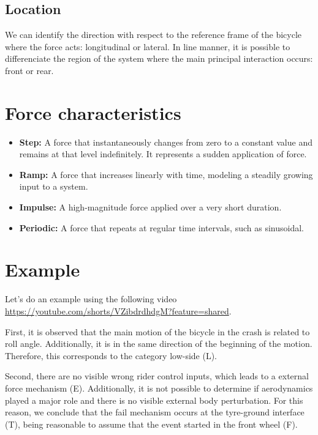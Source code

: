 \documentclass{article}
\begin{document}
\subsection{Location}

We can identify the direction with respect to the reference frame of the bicycle where the force acts: longitudinal or lateral.
%
In line manner, it is possible to differenciate the region of the system where the main principal interaction occurs: front or rear.

\section{Force characteristics}


\begin{itemize}
    \item \textbf{Step:} A force that instantaneously changes from zero to a constant value and remains at that level indefinitely. It represents a sudden application of force.
    \item \textbf{Ramp:} A force that increases linearly with time, modeling a steadily growing input to a system.
    \item \textbf{Impulse:} A high-magnitude force applied over a very short duration.
    \item \textbf{Periodic:} A force that repeats at regular time intervals, such as sinusoidal.
\end{itemize}


\section{Example}

Let's do an example using the following video \url{https://youtube.com/shorts/VZibdrdhdgM?feature=shared}.

First, it is observed that the main motion of the bicycle in the crash is related to roll angle.
%
Additionally, it is in the same direction of the beginning of the motion.
%
Therefore, this corresponds to the category low-side (L).


Second, there are no visible wrong rider control inputs, which leads to a external force mechanism (E).
%
Additionally, it is not possible to determine if aerodynamics played a major role and there is no visible external body perturbation.
%
For this reason, we conclude that the fail mechanism occurs at the tyre-ground interface (T), being reasonable to assume that the event started in the front wheel (F).
\end{document}
